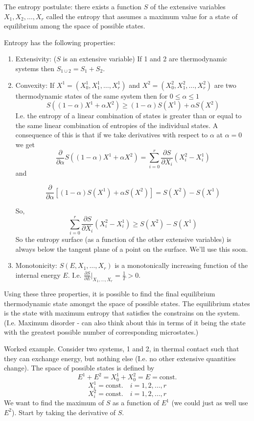 \documentclass{article}
\begin{document}
The entropy postulate: there exists a function $S$ of the extensive variables $X_1,X_2,\ldots,X_r$ called the entropy that assumes a maximum value for a state of equilibrium among the space of possible states.

Entropy has the following properties:
\begin{enumerate}
\item Extensivity: ($S$ is an extensive variable) If 1 and 2 are thermodynamic systems then $S_{1\cup2}=S_1+S_2$.
\item Convexity: If $X^1=(X_0^1,X_1^1,\ldots,X_r^1)$ and  $X^2=(X_0^2,X_1^2,\ldots,X_r^2)$ are two thermodynamic states of the same system then for $0\leq\alpha\leq1$
$$ S((1-\alpha)X^1+\alpha X^2)\geq (1-\alpha)S(X^1)+\alpha S(X^2) $$
I.e. the entropy of a linear combination of states is greater than or equal to the same linear combination of entropies of the individual states.
A consequence of this is that if we take derivatives with respect to $\alpha$ at $\alpha=0$ we get
$$\frac{\partial}{\partial \alpha} S((1-\alpha)X^1+\alpha X^2) = \sum_{i=0}^r\frac{\partial S}{\partial X_i}(X_i^2-X_i^1)$$
and

$$\frac{\partial}{\partial \alpha} \left[ (1-\alpha)S(X^1)+\alpha S(X^2) \right] = S(X^2)-S(X^1)$$

So,
$$ \sum_{i=0}^r\frac{\partial S}{\partial X_i}(X_i^2-X_i^1)\geq  S(X^2)-S(X^1)$$
So the entropy surface (as a function of the other extensive variables) is always below the tangent plane of a point on the surface. We'll use this soon.
\item Monotonicity: $S(E,X_1,\ldots,X_r)$ is a monotonically increasing function of the internal energy $E$. I.e. $\frac{\partial S}{\partial E}\vert_{X_1,\ldots,X_r} = \frac{1}{T}>0$.
\end{enumerate}

Using these three properties, it is possible to find the final equilibrium thermodynamic state amongst the space of possible states. The equilibrium states is the state with maximum entropy that satisfies the constrains on the system. (I.e. Maximum disorder - can also think about this in terms of it being the state with the greatest possible number of corresponding microstates.)

Worked example. Consider two systems, 1 and 2, in thermal contact such that they can exchange energy, but nothing else (I.e. no other extensive quantities change). The space of possible states is defined by 
$$E^1+E^2 = X_0^1+X_0^2 = E = \text{const.}$$
$$X_i^1 = \text{const.}\quad i=1,2,\ldots,r$$
$$X_i^2 = \text{const.}\quad i=1,2,\ldots,r$$
We want to find the maximum of $S$ as a function of $E^1$ (we could just as well use $E^2$). Start by taking the derivative of $S$.
\end{document}

